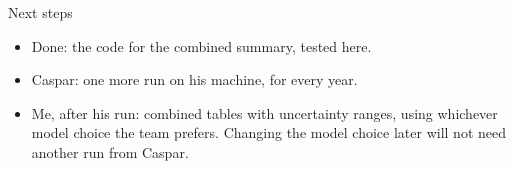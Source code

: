 \documentclass[aspectratio=169,11pt]{beamer}
\begin{document}
\begin{frame}{Next steps}
  \begin{itemize}
    \item Done: the code for the combined summary, tested here.
    \item Caspar: one more run on his machine, for every year.
    \item Me, after his run: combined tables with uncertainty ranges, using
      whichever model choice the team prefers. Changing the model choice
      later will not need another run from Caspar.
  \end{itemize}
\end{frame}
\end{document}

